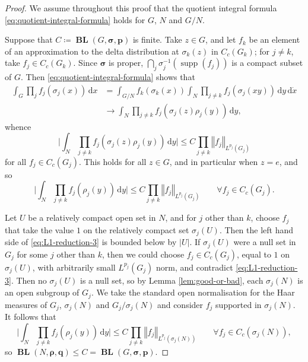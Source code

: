 \documentclass[12pt,twoside,a4paper]{amsart}
\theoremstyle{definition}
\theoremstyle{remark}
\numberwithin{equation}{section}
\newcommand{\supp}{\operatorname{supp}}
\newcommand{\wrt}[1]{\,\mathrm{d} #1}
\newcommand{\BL}{\operatorname{\mathbf{BL}}}
\newcommand{\bss}{\boldsymbol{\sigma}}
\newcommand{\bsrho}{\boldsymbol{\rho}}
\newcommand{\bsp}{\boldsymbol{p}}
\newcommand{\bsq}{\boldsymbol{q}}
\newcommand{\norm}[1]{\left\Vert #1 \right\Vert}
\newcommand{\bigglabs}{\biggl\vert}
\newcommand{\biggrabs}{\biggr\vert}
\begin{document}
\begin{proof}
We assume throughout this proof that the quotient integral formula \eqref{eq:quotient-integral-formula} holds for $G$, $N$ and $G/N$.

Suppose that $C \coloneqq  \BL(G, \bss, \bsp)$ is finite.
Take $z \in G$, and let $f_k$ be an element of an approximation to the delta distribution at $\sigma_k(z)$ in $C_c(G_k)$; for $j \neq k$, take $f_j \in C_c(G_k)$.
Since $\bss$ is proper, $\bigcap_j \sigma_j^{-1}(\supp(f_j))$ is a compact subset of $G$.
Then \eqref{eq:quotient-integral-formula} shows that
\begin{equation}\label{eq:L1-reduction-1}
\begin{aligned}
\int_{G} \prod_{j} f_j(\sigma_j(x)) \wrt{x}
&= \int_{G/N} f_k(\sigma_k(x)) \int_{N} \prod_{j\neq k} f_j(\sigma_j(xy)) \wrt{y} \wrt{\dot{x}} \\
&\to \int_{N} \prod_{j\neq k} f_j(\sigma_j(z) \rho_j(y)) \wrt{y} ,
\end{aligned}
\end{equation}
whence
\begin{equation}\label{eq:L1-reduction-2}
\bigglabs \int_{N} \prod_{j\neq k} f_j(\sigma_j(z)\rho_j(y)) \wrt{y} \biggrabs
\leq C \prod_{j\neq k} \norm{ f_j }_{L^{p_j}(G_j)} 
\end{equation}
for all $f_j \in C_c(G_j)$.
This holds for all $z \in G$, and in particular when $z = e$, and so 
\begin{equation}\label{eq:L1-reduction-3}
\bigglabs \int_{N} \prod_{j\neq k} f_j(\rho_j(y)) \wrt{y} \biggrabs
\leq C \prod_{j\neq k} \norm{ f_j }_{L^{p_j}(G_j)} 
\qquad\forall f_j \in C_c(G_j).
\end{equation}

Let $U$ be a relatively compact open set in $N$, and for $j$ other than $k$, choose $f_j$ that take the value $1$ on the relatively compact set $\sigma_j(U)$.
Then the left hand side of \eqref{eq:L1-reduction-3} is bounded below by $|U|$.
If $\sigma_j(U)$ were a null set in $G_j$ for some $j$ other than $k$, then we could choose $f_j \in C_c(G_j)$, equal to $1$ on $\sigma_j(U)$, with arbitrarily small ${L^{p_j}(G_j)}$ norm, and contradict \eqref{eq:L1-reduction-3}.
Then no $\sigma_j(U)$ is a null set, so by Lemma \ref{lem:good-or-bad},  each $\sigma_j(N)$ is an open subgroup of $G_j$. 
We take the standard open normalisation for the Haar measures of $G_j$, $\sigma_j(N)$ and $G_j/\sigma_j(N)$ and consider $f_j$ supported in $\sigma_j(N)$. 
It follows that
\[
\bigglabs \int_{N} \prod_{j\neq k} f_j(\rho_j(y)) \wrt{y} \biggrabs
\leq C \prod_{j\neq k} \norm{ f_j }_{L^{p_j}(\sigma_j(N))} 
\qquad\forall f_j \in C_c(\sigma_j(N)),
\]
so $\BL(N, \bsrho, \bsq) \leq C = \BL(G, \bss, \bsp)$.


\end{proof}
\end{document}
